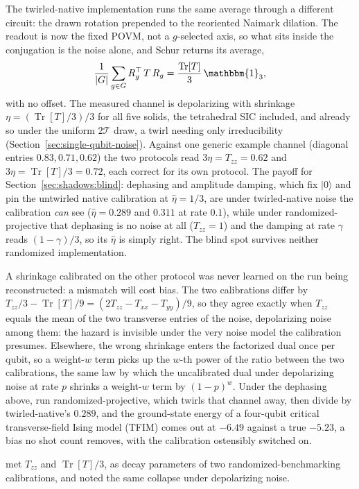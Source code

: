 \documentclass[11pt, oneside, openany]{scrbook}
\DeclareMathOperator{\Tr}{Tr}
\newcommand{\Id}{\mathbbm{1}}
\newcommand{\Tgroup}{\mathcal{T}}  %
\newcommand{\TwoT}{2\Tgroup}
\newcommand{\ket}[1]{|#1\rangle}
\begin{document}
The twirled-native implementation runs the same average through a different circuit: the drawn rotation prepended to the reoriented Naimark dilation. The readout is now the fixed POVM, not a $g$-selected axis, so what sits inside the conjugation is the noise alone, and Schur returns its average,
\begin{equation*}
  \frac{1}{|G|}\sum_{g \in G} R_g^\top\, T\, R_g = \frac{\Tr[T]}{3}\,\Id_3,
\end{equation*}
with no offset. The measured channel is depolarizing with shrinkage $\eta = (\Tr[T]/3)/3$ for all five solids, the tetrahedral SIC included, and already so under the uniform $\TwoT$ draw, a twirl needing only irreducibility (Section~\ref{sec:single-qubit-noise}). Against one generic example channel (diagonal entries $0.83, 0.71, 0.62$) the two protocols read $3\eta = T_{zz} = 0.62$ and $3\eta = \Tr[T]/3 = 0.72$, each correct for its own protocol. The payoff for Section~\ref{sec:shadows:blind}: dephasing and amplitude damping, which fix $\ket{0}$ and pin the untwirled native calibration at $\hat\eta = 1/3$, are under twirled-native noise the calibration \textit{can} see ($\hat\eta = 0.289$ and $0.311$ at rate $0.1$), while under randomized-projective that dephasing is no noise at all ($T_{zz} = 1$) and the damping at rate $\gamma$ reads $(1-\gamma)/3$, so its $\hat\eta$ is simply right. The blind spot survives neither randomized implementation.

A shrinkage calibrated on the other protocol was never learned on the run being reconstructed: a mismatch will cost bias. The two calibrations differ by $T_{zz}/3 - \Tr[T]/9 = (2T_{zz} - T_{xx} - T_{yy})/9$, so they agree exactly when $T_{zz}$ equals the mean of the two transverse entries of the noise, depolarizing noise among them: the hazard is invisible under the very noise model the calibration presumes. Elsewhere, the wrong shrinkage enters the factorized dual once per qubit, so a weight-$w$ term picks up the $w$-th power of the ratio between the two calibrations, the same law by which the uncalibrated dual under depolarizing noise at rate $p$ shrinks a weight-$w$ term by $(1-p)^w$. Under the dephasing above, run randomized-projective, which twirls that channel away, then divide by twirled-native's $0.289$, and the ground-state energy of a four-qubit critical transverse-field Ising model (TFIM) comes out at $-6.49$ against a true $-5.23$, a bias no shot count removes, with the calibration ostensibly switched on.

\textcite{onorati2024noisemitigatedrandomizedmeasurements} met $T_{zz}$ and $\Tr[T]/3$, as decay parameters of two randomized-benchmarking calibrations, and noted the same collapse under depolarizing noise.
\end{document}
